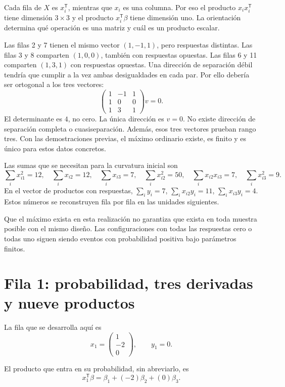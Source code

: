 \documentclass[11pt,a4paper]{article}
\newcommand{\T}{^{\mathsf T}}
\begin{document}
Cada fila de \(X\) es \(x_i\T\), mientras que \(x_i\) es una columna.
Por eso el producto \(x_ix_i\T\) tiene dimensión \(3\times3\)
y el producto \(x_i\T\beta\) tiene dimensión uno.
La orientación determina qué operación es una matriz y cuál
es un producto escalar.

Las filas 2 y 7 tienen el mismo vector \((1,-1,1)\),
pero respuestas distintas. Las filas 3 y 8 comparten
\((1,0,0)\), también con respuestas opuestas.
Las filas 6 y 11 comparten \((1,3,1)\) con respuestas opuestas.
Una dirección de separación débil tendría que cumplir
a la vez ambas desigualdades en cada par. Por ello
debería ser ortogonal a los tres vectores:
\[
\begin{pmatrix}1&-1&1\\1&0&0\\1&3&1\end{pmatrix}v=0.
\]
El determinante es \(4\), no cero.
La única dirección es \(v=0\).
No existe dirección de separación completa o cuasiseparación.
Además, esos tres vectores prueban rango tres.
Con las demostraciones previas, el máximo ordinario
existe, es finito y es único para estos datos concretos.

Las sumas que se necesitan para la curvatura inicial son
\[
\sum_i x_{i1}^2=12,\quad
\sum_i x_{i2}=12,\quad
\sum_i x_{i3}=7,\quad
\sum_i x_{i2}^2=50,\quad
\sum_i x_{i2}x_{i3}=7,\quad
\sum_i x_{i3}^2=9.
\]
En el vector de productos con respuestas,
\(\sum_i y_i=7\), \(\sum_i x_{i2}y_i=11\),
\(\sum_i x_{i3}y_i=4\).
Estos números se reconstruyen fila por fila en las unidades siguientes.

Que el máximo exista en esta realización no garantiza
que exista en toda muestra posible con el mismo diseño.
Las configuraciones con todas las respuestas cero o todas uno
siguen siendo eventos con probabilidad positiva bajo
parámetros finitos.

\clearpage
\section{Fila 1: probabilidad, tres derivadas y nueve productos}\label{logit83}
La fila que se desarrolla aquí es
\[
x_{1}=\begin{pmatrix}1\\-2\\0\end{pmatrix},\qquad y_{1}=0.
\]

El producto que entra en su probabilidad, sin abreviarlo, es
\[
x_{1}\T\beta=\beta_1+(-2)\beta_2+(0)\beta_3.
\]
\end{document}
